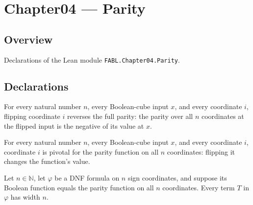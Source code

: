\chapter{Chapter04 — Parity}
\section{Overview}

Declarations of the Lean module \texttt{FABL.Chapter04.Parity}.

\section{Declarations}

\begin{theorem}
\label{FABL.parityFunction_univ_flipCoordinate}
\leanok
{}
For every natural number $n$, every Boolean-cube input $x$, and every coordinate $i$,
flipping coordinate $i$ reverses the full parity: the parity over all $n$ coordinates at
the flipped input is the negative of its value at $x$.
\end{theorem}

\begin{theorem}
\label{FABL.parityFunction_univ_isPivotal}
\leanok
{}
For every natural number $n$, every Boolean-cube input $x$, and every coordinate $i$,
coordinate $i$ is pivotal for the parity function on all $n$ coordinates: flipping it
changes the function's value.
\end{theorem}

\begin{theorem}
\label{FABL.DNFFormula.term_width_eq_dimension_of_computes_parity}
\leanok
{}
Let $n\in\mathbb{N}$, let $\varphi$ be a DNF formula on $n$ sign coordinates, and
suppose its Boolean function equals the parity function on all $n$ coordinates. Every
term $T$ in $\varphi$ has width $n$.
\end{theorem}

